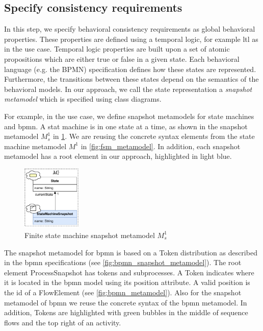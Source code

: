 \documentclass{jot}
\begin{document}
\subsection{Specify consistency requirements} \label{subsec:specify_consistency_requirements}
In this step, we specify behavioral consistency requirements as global behavioral properties.
These properties are defined using a temporal logic, for example \gls*{ltl} as in the use case.
Temporal logic properties are built upon a set of atomic propositions which are either true or false in a given state.
Each behavioral language (e.g. the BPMN) specification defines how these states are represented.
Furthermore, the transitions between these states depend on the semantics of the behavioral models.
In our approach, we call the state representation a \emph{snapshot metamodel} which is specified using class diagrams.

For example, in the use case, we define snapshot metamodels for state machines and \gls*{bpmn}.
A stat machine is in one state at a time, as shown in the snapshot metamodel $M_s^1$ in \cref{fig:fsm_snapshot_metamodel}.
We are reusing the concrete syntax elements from the state machine metamodel $M^1$ in \cref{fig:fsm_metamodel}.
In addition, each snapshot metamodel has a root element in our approach, highlighted in light blue.
\begin{figure}[h]
    \centering
    \includegraphics[width=0.25\textwidth]{figures/state_machine_snapshot_metamodel.pdf}
    \caption{Finite state machine snapshot metamodel $M_s^1$}
    \label{fig:fsm_snapshot_metamodel}
\end{figure}

The snapshot metamodel for \gls*{bpmn} is based on a \textsf{Token} distribution as described in the \gls*{bpmn} specifications \cite{objectmanagementgroupBusinessProcessModel2013} (see \cref{fig:bpmn_snapshot_metamodel}). 
The root element \textsf{ProcessSnapshot} has \textsf{tokens} and \textsf{subprocesses}.
A \textsf{Token} indicates where it is located in the \gls*{bpmn} model using its \textsf{position} attribute.
A valid \textsf{position} is the \textsf{id} of a \textsf{FlowElement} (see \cref{fig:bpmn_metamodel}).
Also for the snapshot metamodel of \gls*{bpmn} we reuse the concrete syntax of the \gls*{bpmn} metamodel.
In addition, \textsf{Token}s are highlighted with green bubbles in the middle of sequence flows and the top right of an activity.
\end{document}
